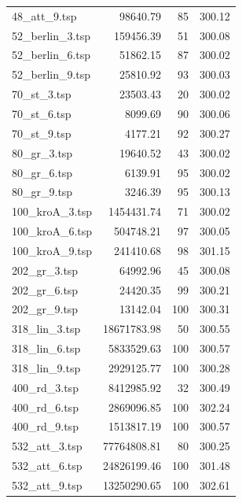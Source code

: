 \begin{table}[H]
\begin{tabular}{|l|r|r|r|}
48\_att\_9.tsp & 98640.79 & 85 & 300.12 \\
52\_berlin\_3.tsp & 159456.39 & 51 & 300.08 \\
52\_berlin\_6.tsp & 51862.15 & 87 & 300.02 \\
52\_berlin\_9.tsp & 25810.92 & 93 & 300.03 \\
70\_st\_3.tsp & 23503.43 & 20 & 300.02 \\
70\_st\_6.tsp & 8099.69 & 90 & 300.06 \\
70\_st\_9.tsp & 4177.21 & 92 & 300.27 \\
80\_gr\_3.tsp & 19640.52 & 43 & 300.02 \\
80\_gr\_6.tsp & 6139.91 & 95 & 300.02 \\
80\_gr\_9.tsp & 3246.39 & 95 & 300.13 \\
100\_kroA\_3.tsp & 1454431.74 & 71 & 300.02 \\
100\_kroA\_6.tsp & 504748.21 & 97 & 300.05 \\
100\_kroA\_9.tsp & 241410.68 & 98 & 301.15 \\
202\_gr\_3.tsp & 64992.96 & 45 & 300.08 \\
202\_gr\_6.tsp & 24420.35 & 99 & 300.21 \\
202\_gr\_9.tsp & 13142.04 & 100 & 300.31 \\
318\_lin\_3.tsp & 18671783.98 & 50 & 300.55 \\
318\_lin\_6.tsp & 5833529.63 & 100 & 300.57 \\
318\_lin\_9.tsp & 2929125.77 & 100 & 300.28 \\
400\_rd\_3.tsp & 8412985.92 & 32 & 300.49 \\
400\_rd\_6.tsp & 2869096.85 & 100 & 302.24 \\
400\_rd\_9.tsp & 1513817.19 & 100 & 300.57 \\
532\_att\_3.tsp & 77764808.81 & 80 & 300.25 \\
532\_att\_6.tsp & 24826199.46 & 100 & 301.48 \\
532\_att\_9.tsp & 13250290.65 & 100 & 302.61 \\
\hline
\end{tabular}
\end{table}
